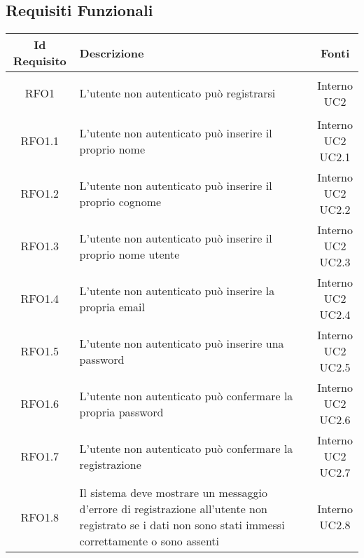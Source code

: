 \subsection{Requisiti Funzionali}
\normalsize
\begin{longtable}{|c|>{\centering}m{7cm}|c|}
\hline
\textbf{Id Requisito} & \textbf{Descrizione} & \textbf{Fonti}\\
\hline
\endhead \hypertarget{{RFO1}}{{RFO1}} & L’utente non autenticato può registrarsi & \makecell{Interno\\ UC2 } \\ \hline
			 \hypertarget{{RFO1.1}}{{RFO1.1}} & L’utente non autenticato può inserire il proprio nome & \makecell{Interno\\ UC2 \\UC2.1 } \\ \hline
			 \hypertarget{{RFO1.2}}{{RFO1.2}} & L’utente non autenticato può inserire il proprio cognome & \makecell{Interno\\ UC2 \\UC2.2 } \\ \hline
			 \hypertarget{{RFO1.3}}{{RFO1.3}} & L’utente non autenticato può inserire il proprio nome utente & \makecell{Interno\\ UC2 \\UC2.3 } \\ \hline
			 \hypertarget{{RFO1.4}}{{RFO1.4}} & L’utente non autenticato può inserire la propria email & \makecell{Interno\\ UC2 \\UC2.4 } \\ \hline
			 \hypertarget{{RFO1.5}}{{RFO1.5}} & L’utente non autenticato può inserire una password & \makecell{Interno\\ UC2 \\UC2.5 } \\ \hline
			 \hypertarget{{RFO1.6}}{{RFO1.6}} & L’utente non autenticato può confermare la propria password & \makecell{Interno\\ UC2 \\UC2.6 } \\ \hline
			 \hypertarget{{RFO1.7}}{{RFO1.7}} & L’utente non autenticato può confermare la registrazione & \makecell{Interno\\ UC2 \\UC2.7 } \\ \hline
			 \hypertarget{{RFO1.8}}{{RFO1.8}} & Il sistema deve mostrare un messaggio d’errore di registrazione all’utente non registrato se i dati non sono stati immessi correttamente o sono assenti & \makecell{Interno\\ UC2.8 } \\ \hline

\end{longtable}
